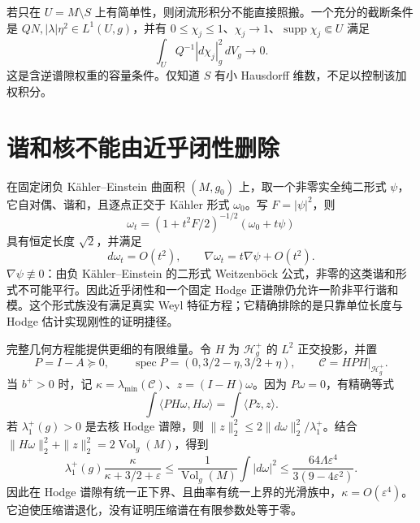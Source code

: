 \documentclass[UTF8,fontset=fandol,zihao=-4,oneside,openany]{ctexbook}
\theoremstyle{cjkplain}
\numberwithin{equation}{chapter}
\DeclareMathOperator{\Vol}{Vol}
\begin{document}
若只在 $U=M\setminus S$ 上有简单性，则闭流形积分不能直接照搬。一个充分的截断条件是 $QN,|\lambda|\eta^2\in L^1(U,g)$，并有 $0\le\chi_j\le1$、$\chi_j\to1$、$\operatorname{supp}\chi_j\Subset U$ 满足
\[
\int_U Q^{-1}|d\chi_j|_g^2\,dV_g\longrightarrow0.
\]
这是含逆谱隙权重的容量条件。仅知道 $S$ 有小 Hausdorff 维数，不足以控制该加权积分。

\section{谐和核不能由近乎闭性删除}
在固定闭负 Kähler--Einstein 曲面积 $(M,g_0)$ 上，取一个非零实全纯二形式 $\psi$，它自对偶、谐和，且逐点正交于 Kähler 形式 $\omega_0$。写 $F=|\psi|^2$，则
\[
\omega_t=(1+t^2F/2)^{-1/2}(\omega_0+t\psi)
\]
具有恒定长度 $\sqrt2$，并满足
\[
d\omega_t=O(t^2),\qquad \nabla\omega_t=t\nabla\psi+O(t^2).
\]
$\nabla\psi\not\equiv0$：由负 Kähler--Einstein 的二形式 Weitzenböck 公式，非零的这类谐和形式不可能平行。因此近乎闭性和一个固定 Hodge 正谱隙仍允许一阶非平行谐和模。这个形式族没有满足真实 Weyl 特征方程；它精确排除的是只靠单位长度与 Hodge 估计实现刚性的证明捷径。

完整几何方程能提供更细的有限维量。令 $H$ 为 $\mathcal H_g^+$ 的 $L^2$ 正交投影，并置
\[
P=I-A\succeq0,\qquad
\operatorname{spec}P=(0,3/2-\eta,3/2+\eta),\qquad
\mathcal C=HPH|_{\mathcal H_g^+}.
\]
当 $b^+>0$ 时，记 $\kappa=\lambda_{\min}(\mathcal C)$、$z=(I-H)\omega$。因为 $P\omega=0$，有精确等式
\begin{equation}\label{WYL:compression}
\int\langle PH\omega,H\omega\rangle=
\int\langle Pz,z\rangle.
\end{equation}
若 $\lambda_1^+(g)>0$ 是去核 Hodge 谱隙，则
$\|z\|_2^2\le2\|d\omega\|_2^2/\lambda_1^+$。结合
$\|H\omega\|_2^2+\|z\|_2^2=2\Vol_g(M)$，得到
\begin{equation}\label{WYL:compressiongap}
\lambda_1^+(g)\frac{\kappa}{\kappa+3/2+\varepsilon}
\le\frac1{\Vol_g(M)}\int|d\omega|^2
\le\frac{64\Lambda\varepsilon^4}{3(9-4\varepsilon^2)}.
\end{equation}
因此在 Hodge 谱隙有统一正下界、且曲率有统一上界的光滑族中，$\kappa=O(\varepsilon^4)$。它迫使压缩谱退化，没有证明压缩谱在有限参数处等于零。
\end{document}
